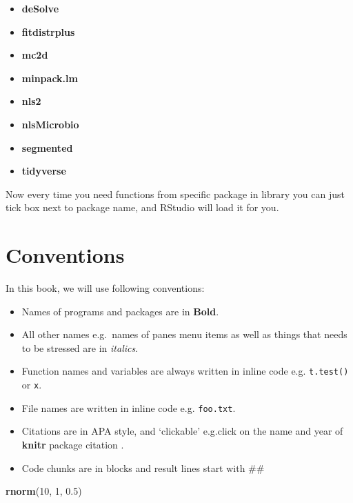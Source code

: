 \documentclass[]{book}
\newenvironment{Shaded}{\begin{snugshade}}{\end{snugshade}}
\newcommand{\KeywordTok}[1]{\textcolor[rgb]{0.13,0.29,0.53}{\textbf{#1}}}
\newcommand{\DecValTok}[1]{\textcolor[rgb]{0.00,0.00,0.81}{#1}}
\newcommand{\FloatTok}[1]{\textcolor[rgb]{0.00,0.00,0.81}{#1}}
\newcommand{\NormalTok}[1]{#1}
\providecommand{\tightlist}{%
  \setlength{\itemsep}{0pt}\setlength{\parskip}{0pt}}
\theoremstyle{definition}
\theoremstyle{definition}
\theoremstyle{definition}
\theoremstyle{remark}
\begin{document}
\begin{itemize}
\tightlist
\item
  \textbf{deSolve} \citep{R-deSolve}
\item
  \textbf{fitdistrplus} \citep{R-fitdistrplus}
\item
  \textbf{mc2d} \citep{R-mc2d}
\item
  \textbf{minpack.lm} \citep{R-minpack.lm}
\item
  \textbf{nls2} \citep{R-nls2}
\item
  \textbf{nlsMicrobio} \citep{R-nlsMicrobio}
\item
  \textbf{segmented} \citep{R-segmented}
\item
  \textbf{tidyverse} \citep{R-tidyverse, R-dplyr, R-ggplot2, R-tidyr}
\end{itemize}

Now every time you need functions from specific package in library you
can just tick box next to package name, and RStudio will load it for
you.

\section{Conventions}\label{conventions}

In this book, we will use following conventions:

\begin{itemize}
\tightlist
\item
  Names of programs and packages are in \textbf{Bold}.
\item
  All other names e.g.~names of panes menu items as well as things that
  needs to be stressed are in \emph{italics}.
\item
  Function names and variables are always written in inline code e.g.
  \texttt{t.test()} or \texttt{x}.
\item
  File names are written in inline code e.g. \texttt{foo.txt}.
\item
  Citations are in APA style, and `clickable' e.g.click on the name and
  year of \textbf{knitr} package citation \citep{xie2015}.
\item
  Code chunks are in blocks and result lines start with \#\#
\end{itemize}

\begin{Shaded}
\begin{Highlighting}[]
\KeywordTok{rnorm}\NormalTok{(}\DecValTok{10}\NormalTok{, }\DecValTok{1}\NormalTok{, }\FloatTok{0.5}\NormalTok{)}
\end{Highlighting}
\end{Shaded}
\end{document}
